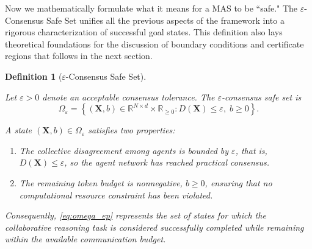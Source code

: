 \documentclass[journal,twoside,web]{ieeecolor_no_firstpage_logo}
\newtheorem{definition}{Definition}
\begin{document}
Now we mathematically formulate what it means for a MAS to be ``safe." The $\varepsilon$-Consensus Safe Set unifies all the previous aspects of the framework into a rigorous characterization of successful goal states. This definition also lays theoretical foundations for the discussion of boundary conditions and certificate regions that follows in the next section. 
\begin{definition}[$\varepsilon$-Consensus Safe Set]
\label{def:epssafe}

Let $\varepsilon>0$ denote an acceptable consensus tolerance.
The \emph{$\varepsilon$-consensus safe set} is
\begin{equation} \label{eq:omega_ep}
\Omega_\varepsilon
=
\left\{
(\mathbf{X},b)\in
\mathbb R^{N\times d}\times\mathbb R_{\ge0}
:
D(\mathbf{X})\le\varepsilon,
\;
b\ge0
\right\}.
\end{equation} 

A state $(\mathbf{X},b)\in\Omega_\varepsilon$ satisfies two properties:

\begin{enumerate}
\item The collective disagreement among agents is bounded by
      $\varepsilon$, that is, $D(\mathbf{X})\le\varepsilon$,
      so the agent network has reached practical consensus.
\item The remaining token budget is nonnegative, $b\ge0$,
      ensuring that no computational resource constraint has been violated.
\end{enumerate}

Consequently, \eqref{eq:omega_ep} represents the set of states for
which the collaborative reasoning task is considered successfully
completed while remaining within the available communication budget.
\end{definition}
\end{document}
